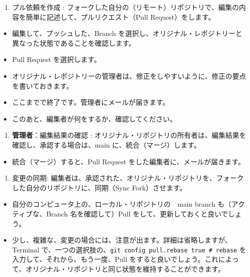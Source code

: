 \documentclass[
  xelatex, ja=standard]{bxjsbook}
\providecommand{\tightlist}{%
  \setlength{\itemsep}{0pt}\setlength{\parskip}{0pt}}
\theoremstyle{definition}
\theoremstyle{definition}
\theoremstyle{definition}
\theoremstyle{definition}
\theoremstyle{remark}
\begin{document}
\begin{enumerate}
\def\labelenumi{\arabic{enumi}.}
\setcounter{enumi}{7}
\tightlist
\item
  プル依頼を作成 : フォークした自分の（リモート）リポジトリで、編集の内容を簡単に記述して、プルリクエスト（Pull Request）をします。
\end{enumerate}

\begin{itemize}
\tightlist
\item
  編集して、プッシュした、Branch を選択し、オリジナル・レポジトリーと異なった状態であることを確認します。
\item
  Pull Request を選択します。
\item
  オリジナル・レポジトリーの管理者は、修正をしやすいように、修正の要点を書いておきます。
\item
  ここまでで終了です。管理者にメールが届きます。
\item
  このあと、編集者が何をするか、確認してください。
\end{itemize}

\begin{enumerate}
\def\labelenumi{\arabic{enumi}.}
\setcounter{enumi}{8}
\tightlist
\item
  \textbf{管理者}：編集結果の確認 : オリジナル・リポジトリの所有者は、編集結果を確認し、承認する場合は、main に、統合（マージ）します。
\end{enumerate}

\begin{itemize}
\tightlist
\item
  統合（マージ）すると、Pull Request をした編集者に、メールが届きます。
\end{itemize}

\begin{enumerate}
\def\labelenumi{\arabic{enumi}.}
\setcounter{enumi}{9}
\tightlist
\item
  変更の同期: 編集者は、承認された、オリジナル・リポジトリを、フォークした自分のリポジトリに、同期（Sync Fork）させます。
\end{enumerate}

\begin{itemize}
\tightlist
\item
  自分のコンピュータ上の、ローカル・リポジトリの　main branch も（アクティブな、Branch 名を確認して）Pull をして、更新しておくと良いでしょう。
\item
  少し、複雑な、変更の場合には、注意が出ます。詳細は省略しますが、Terminal で、一つの選択肢の、\texttt{git\ config\ pull.rebase\ true\ \#\ rebase} を入力して、それから、もう一度、Pull をすると良いでしょう。これによって、オリジナル・リポジトリと同じ状態を維持することができます。
\end{itemize}
\end{document}
